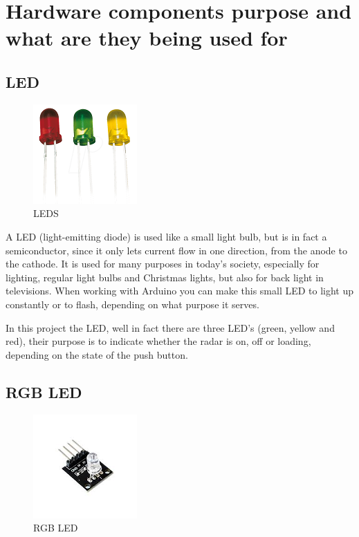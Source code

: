\section{ Hardware components purpose and what are they being used for}

\subsection{LED}

\begin{figure} [h!]
\centering
  \includegraphics{fig/LEDperur}
  \caption{LEDS}
  \label{fig:LEDS}
\end{figure}

A LED (light-emitting diode) is used like a small light bulb, but is in fact a semiconductor, since it only lets current flow in one direction, from the anode to the cathode. It is used for many purposes in today's society, especially for lighting, regular light bulbs and Christmas lights, but also for back light in televisions. When working with Arduino you can make this small LED to light up constantly or to flash, depending on what purpose it serves. 

In this project the LED, well in fact there are three LED's (green, yellow and red), their purpose is to indicate whether the radar is on, off or loading, depending on the state of the push button. 

\subsection{RGB LED}

\begin{figure} [h!]
\centering
  \includegraphics{fig/RGBLED}
  \caption{RGB LED}
  \label{fig:RGBLED}
\end{figure}

